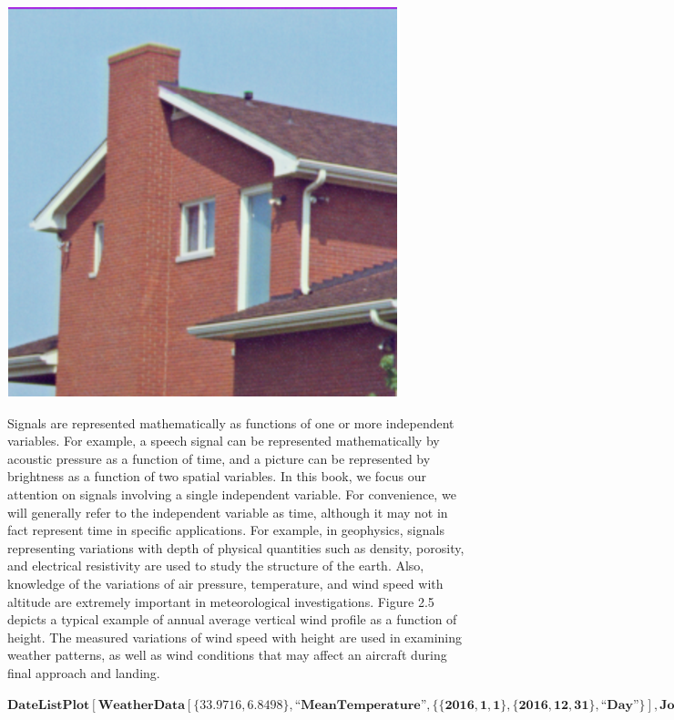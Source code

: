 \documentclass{report}
\begin{document}
\includegraphics{GhassaneAniba_Signals_Systems_Oppenheim_Chap1_gr2.eps}

Signals are represented mathematically as functions of one or more independent variables. For example, a speech signal can be represented mathematically
by acoustic pressure as a function of time, and a picture can be represented by brightness as a function of two spatial variables. In this book,
we focus our attention on signals involving a single independent variable. For convenience, we will generally refer to the independent variable as
time, although it may not in fact represent time in specific applications. For example, in geophysics, signals representing variations with depth
of physical quantities such as density, porosity, and electrical resistivity are used to study the structure of the earth. Also, knowledge of the
variations of air pressure, temperature, and wind speed with altitude are extremely important in meteorological investigations. Figure 2.5 depicts
a typical example of annual average vertical wind profile as a function of height. The measured variations of wind speed with height are used in
examining weather patterns, as well as wind conditions that may affect an aircraft during final approach and landing.

\begin{doublespace}
\noindent\(\pmb{\text{DateListPlot}[\text{WeatherData}[\{33.9716,6.8498\}, \text{{``}MeanTemperature{''}}, \{\{2016, 1, 1\}, \{2016, 12, 31\}, \text{{``}Day{''}}\}],\text{Joined}
\text{-$>$} \text{True}]}\)
\end{doublespace}
\end{document}
